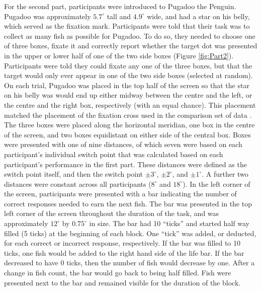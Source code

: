 \documentclass[vision,article,submit,moreauthors,pdftex,10pt,a4paper]{mdpi}
\begin{document}
For the second part, participants were introduced to Pugadoo the Penguin. Pugadoo was approximately $5.7^{\circ}$ tall and $4.9^{\circ}$ wide, and had a star on his belly, which served as the fixation mark. Participants were told that their task was to collect as many fish as possible for Pugadoo. To do so, they needed to choose one of three boxes, fixate it and correctly report whether the target dot was presented in the upper or lower half of one of the two side boxes (Figure \ref{fig:Part2}). Participants were told they could fixate any one of the three boxes, but that the target would only ever appear in one of the two side boxes (selected at random). On each trial, Pugadoo was placed in the top half of the screen so that the star on his belly was would end up either midway between the centre and the left, or the centre and the right box, respectively (with an equal chance). This placement matched the placement of the fixation cross used in the comparison set of data \cite{Huntlearning}. The three boxes were placed along the horizontal meridian, one box in the centre of the screen, and two boxes equidistant on either side of the central box. Boxes were presented with one of nine distances, of which seven were based on each participant’s individual switch point  that was calculated based on each participant’s performance in the first part. These distances were defined as the switch point itself, and then the switch point $\pm 3^{\circ}$, $ \pm 2^{\circ}$, and  $ \pm 1^{\circ}$. A further two distances were constant across all participants ($8^{\circ}$ and $18^{\circ}$). In the left corner of the screen, participants were presented with a bar indicating the number of correct responses needed to earn the next fish. The bar was presented in the top left corner of the screen throughout the duration of the task, and was approximately $12^{\circ}$ by $0.75^{\circ}$ in size. The bar had 10 “ticks” and started half way filled (5 ticks) at the beginning of each block. One “tick” was added, or deducted, for each correct or incorrect response, respectively. If the bar was filled to 10 ticks, one fish would be added to the right hand side of the life bar. If the bar decreased to have 0 ticks, then the number of fish would decrease by one.  After a change in fish count, the bar would go back to being half filled. Fish were presented next to the bar and remained visible for the duration of the block.
\end{document}
